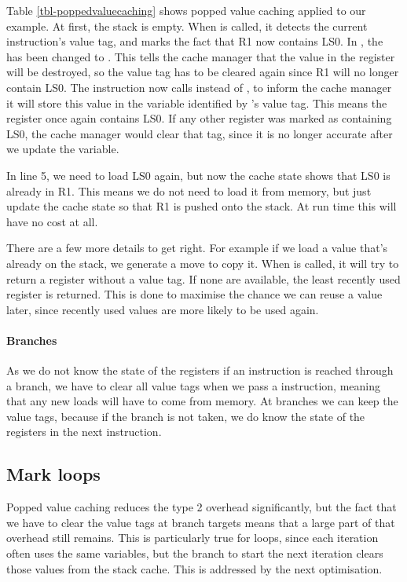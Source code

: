 Table \ref{tbl-poppedvaluecaching} shows popped value caching applied to our example. At first, the stack is empty. When  is called, it detects the current instruction's value tag, and marks the fact that R1 now contains LS0. In , the  has been changed to . This tells the cache manager that the value in the register will be destroyed, so the value tag has to be cleared again since R1 will no longer contain LS0. The  instruction now calls  instead of  , to inform the cache manager it will store this value in the variable identified by 's value tag. This means the register once again contains LS0. If any other register was marked as containing LS0, the cache manager would clear that tag, since it is no longer accurate after we update the variable.

In line 5, we need to load LS0 again, but now the cache state shows that LS0 is already in R1. This means we do not need to load it from memory, but just update the cache state so that R1 is pushed onto the stack. At run time this  will have no cost at all.

There are a few more details to get right. For example if we load a value that's already on the stack, we generate a move to copy it. When  is called, it will try to return a register without a value tag. If none are available, the least recently used register is returned. This is done to maximise the chance we can reuse a value later, since recently used values are more likely to be used again.

\paragraph{Branches} As we do not know the state of the registers if an instruction is reached through a branch, we have to clear all value tags when we pass a  instruction, meaning that any new loads will have to come from memory. At branches we can keep the value tags, because if the branch is not taken, we do know the state of the registers in the next instruction.

\subsection{Mark loops}
\label{sec-optimisation-markloops}

Popped value caching reduces the type 2 overhead significantly, but the fact that we have to clear the value tags at branch targets means that a large part of that overhead still remains. This is particularly true for loops, since each iteration often uses the same variables, but the branch to start the next iteration clears those values from the stack cache. This is addressed by the next optimisation.

